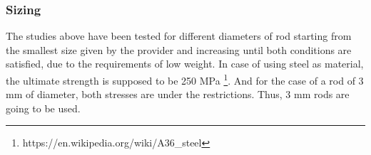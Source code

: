  \subsubsection{Sizing} %
  \label{ssub:sizing}
  The studies above have been tested for different diameters of rod starting from the smallest size given by the provider and increasing until both conditions are satisfied, due to the requirements of low weight.
  In case of using steel as material, the ultimate strength is supposed to be 250 MPa \footnote{https://en.wikipedia.org/wiki/A36\_steel}.
  And for the case of a rod of 3 mm of diameter, both stresses are under the restrictions.
  Thus, 3 mm rods are going to be used.
